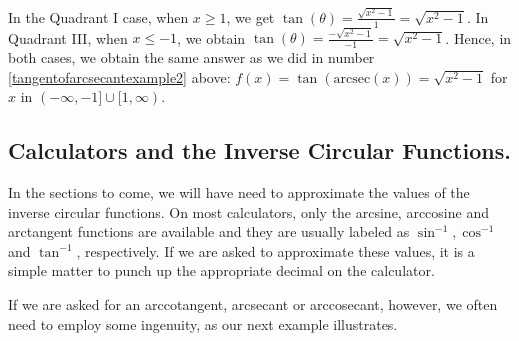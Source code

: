 \smallskip

In the Quadrant I case, when $x \geq 1$, we get $\tan(\theta)  = \frac{\sqrt{x^2-1}}{1} = \sqrt{x^2-1}$.  In Quadrant III, when $x \leq -1$, we obtain  $\tan(\theta)  = \frac{-\sqrt{x^2-1}}{-1} = \sqrt{x^2-1}$.   Hence, in both cases, we obtain the same answer as we did in number \ref{tangentofarcsecantexample2} above:  $f(x)  = \tan(\mbox{arcsec}(x)) = \sqrt{x^2-1}$ for $x$ in $(-\infty, -1] \cup [1, \infty)$.

\smallskip



\subsection{Calculators and the Inverse Circular Functions.}
\label{sectionarcstuffoncalc}

In the sections to come, we will have need to approximate the values of the inverse circular functions.  On most calculators, only the arcsine, arccosine and arctangent functions are available and they are usually labeled as $\sin^{-1}, \cos^{-1}$ and $\tan^{-1}$, respectively.  If we are asked to approximate these values, it is a simple matter to punch up the appropriate decimal on the calculator. 

\smallskip

If we are asked for an arccotangent, arcsecant or arccosecant, however, we often need to employ some ingenuity, as our next example illustrates.

